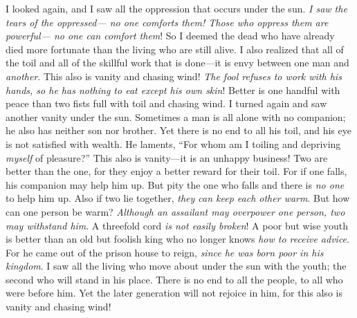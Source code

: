 \begin{biblechapter} %
 I looked again, and I saw all the oppression that occurs under the sun.
\verse \textit{I saw the tears of the oppressed— 
no one comforts them! 
Those who oppress them are powerful— 
no one can comfort them}!
\verse So I deemed the dead who have already died 
more fortunate than the living who are still alive.
 I also realized that all of the toil and all of the skillful work that is done—it is envy between one man and \textit{another}. This also is vanity and chasing wind!
\verse \textit{The fool refuses to work with his hands, 
so he has nothing to eat except his own skin}!
\verse Better is one handful with peace 
than two fists full with toil and chasing wind.
 I turned again and saw another vanity under the sun.
\verse Sometimes a man is all alone with no companion; he also has neither son nor brother. Yet there is no end to all his toil, and his eye is not satisfied with wealth. He laments, “For whom am I toiling and depriving \textit{myself} of pleasure?” This also is vanity—it is an unhappy business!
 Two are better than the one, for they enjoy a better reward for their toil.
\verse For if one falls, his companion may help him up. But pity the one who falls and there is \textit{no one} to help him up.
\verse Also if two lie together, \textit{they can keep each other warm}. But how can one person be warm?
\verse \textit{Although an assailant may overpower one person, two may withstand him}. A threefold cord \textit{is not easily broken}!
 A poor but wise youth is better than an old but foolish king who no longer knows \textit{how to receive advice}.
\verse For he came out of the prison house to reign, \textit{since he was born poor in his kingdom}.
\verse I saw all the living who move about under the sun with the youth; the second who will stand in his place.
\verse There is no end to all the people, to all who were before him. Yet the later generation will not rejoice in him, for this also is vanity and chasing wind!
\end{biblechapter}

